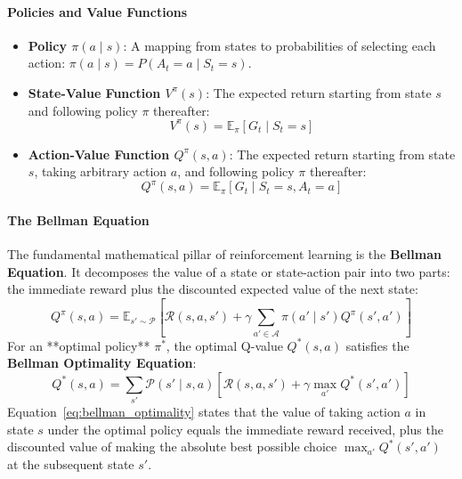 \paragraph{Policies and Value Functions}
\begin{itemize}
    \item \textbf{Policy $\pi(a \mid s)$}: A mapping from states to probabilities of selecting each action: $\pi(a \mid s) = P(A_t = a \mid S_t = s)$.
    \item \textbf{State-Value Function $V^\pi(s)$}: The expected return starting from state $s$ and following policy $\pi$ thereafter:
    \begin{equation}
    V^\pi(s) = \mathbb{E}_\pi\left[ G_t \mid S_t = s \right]
    \end{equation}
    \item \textbf{Action-Value Function $Q^\pi(s, a)$}: The expected return starting from state $s$, taking arbitrary action $a$, and following policy $\pi$ thereafter:
    \begin{equation}
    Q^\pi(s, a) = \mathbb{E}_\pi\left[ G_t \mid S_t = s, A_t = a \right]\label{eq:q_value_def}
    \end{equation}
\end{itemize}

\paragraph{The Bellman Equation}
The fundamental mathematical pillar of reinforcement learning is the \textbf{Bellman Equation}. It decomposes the value of a state or state-action pair into two parts: the immediate reward plus the discounted expected value of the next state:
\begin{equation}
Q^\pi(s, a) = \mathbb{E}_{s' \sim \mathcal{P}}\left[ \mathcal{R}(s, a, s') + \gamma \sum_{a' \in \mathcal{A}} \pi(a' \mid s') Q^\pi(s', a') \right]\label{eq:bellman_expectation}
\end{equation}
For an **optimal policy** $\pi^*$, the optimal Q-value $Q^*(s, a)$ satisfies the \textbf{Bellman Optimality Equation}:
\begin{equation}
Q^*(s, a) = \sum_{s'} \mathcal{P}(s' \mid s, a) \left[ \mathcal{R}(s, a, s') + \gamma \max_{a'} Q^*(s', a') \right]\label{eq:bellman_optimality}
\end{equation}
Equation~\eqref{eq:bellman_optimality} states that the value of taking action $a$ in state $s$ under the optimal policy equals the immediate reward received, plus the discounted value of making the absolute best possible choice $\max_{a'} Q^*(s', a')$ at the subsequent state $s'$.

